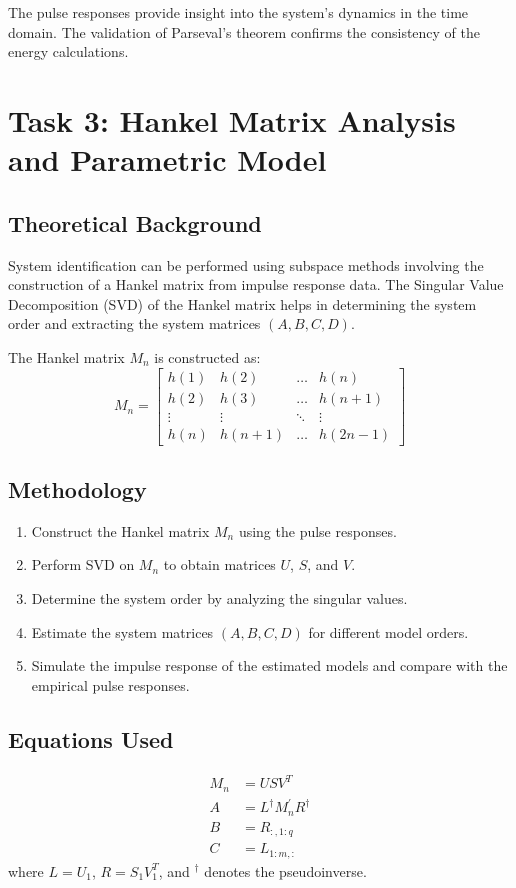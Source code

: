 \documentclass[12pt]{article}
\begin{document}
The pulse responses provide insight into the system's dynamics in the time domain. The validation of Parseval's theorem confirms the consistency of the energy calculations.

\section{Task 3: Hankel Matrix Analysis and Parametric Model}
\subsection{Theoretical Background}
System identification can be performed using subspace methods involving the construction of a Hankel matrix from impulse response data. The Singular Value Decomposition (SVD) of the Hankel matrix helps in determining the system order and extracting the system matrices $(A, B, C, D)$.

The Hankel matrix $M_n$ is constructed as:
\begin{equation}
    M_n = \begin{bmatrix}
    h(1) & h(2) & \dots & h(n) \\
    h(2) & h(3) & \dots & h(n+1) \\
    \vdots & \vdots & \ddots & \vdots \\
    h(n) & h(n+1) & \dots & h(2n-1)
    \end{bmatrix}
\end{equation}

\subsection{Methodology}
\begin{enumerate}
    \item Construct the Hankel matrix $M_n$ using the pulse responses.
    \item Perform SVD on $M_n$ to obtain matrices $U$, $S$, and $V$.
    \item Determine the system order by analyzing the singular values.
    \item Estimate the system matrices $(A, B, C, D)$ for different model orders.
    \item Simulate the impulse response of the estimated models and compare with the empirical pulse responses.
\end{enumerate}

\subsection{Equations Used}
\begin{align}
    M_n &= U S V^T \\
    A &= L^\dagger M_n^\prime R^\dagger \\
    B &= R_{:,1:q} \\
    C &= L_{1:m,:}
\end{align}
where $L = U_1$, $R = S_1 V_1^T$, and $^\dagger$ denotes the pseudoinverse.
\end{document}
